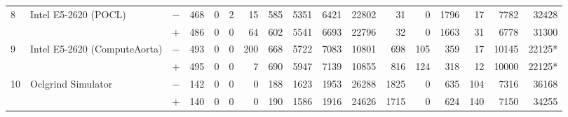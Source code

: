 \begin{tabular}{lll | rrrrrrr | rrrrrrr }
\hline
\multirow{ 2}{*}{8} & \multirow{ 2}{*}{Intel E5-2620 (POCL)} & $-$ & 468 & 0 & 2 & 15 & 585 & 5351 & 6421       & 22802 & 31 & 0 & 1796 & 17 & 7782 & 32428 \\& & $+$ & 486 & 0 & 0 & 64 & 602 & 5541 & 6693 & 22796 & 32 & 0 & 1663 & 31 & 6778 & 31300 \\
\hline
\multirow{ 2}{*}{9} & \multirow{ 2}{*}{Intel E5-2620 (ComputeAorta)} & $-$ & 493 & 0 & 0 & 200 & 668 & 5722 & 7083       & 10801 & 698 & 105 & 359 & 17 & 10145 & 22125* \\& & $+$ & 495 & 0 & 0 & 7 & 690 & 5947 & 7139 & 10855 & 816 & 124 & 318 & 12 & 10000 & 22125* \\
\hline
\multirow{ 2}{*}{10} & \multirow{ 2}{*}{Oclgrind Simulator} & $-$ & 142 & 0 & 0 & 0 & 188 & 1623 & 1953       & 26288 & 1825 & 0 & 635 & 104 & 7316 & 36168 \\& & $+$ & 140 & 0 & 0 & 0 & 190 & 1586 & 1916 & 24626 & 1715 & 0 & 624 & 140 & 7150 & 34255 \\
  \bottomrule
\end{tabular}

